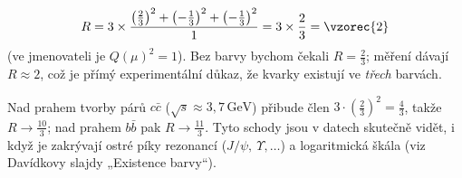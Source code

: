 \[
  R=3\times\frac{\left(\frac23\right)^2+\left(-\frac13\right)^2+
  \left(-\frac13\right)^2}{1}=3\times\frac23=\vzorec{2}
\]
(ve jmenovateli je \(Q(\mu)^2=1\)). Bez barvy bychom čekali
\(R=\tfrac23\); měření dávají \(R\approx2\), což je přímý experimentální
důkaz, že kvarky existují ve \emph{třech} barvách.

\begin{vysvetleni}
Nad prahem tvorby párů \(c\bar c\) (\(\sqrt s\approx3{,}7\,\mathrm{GeV}\))
přibude člen \(3\cdot(\tfrac23)^2=\tfrac43\), takže \(R\to\tfrac{10}3\); nad
prahem \(b\bar b\) pak \(R\to\tfrac{11}3\). Tyto schody jsou v datech
skutečně vidět, i když je zakrývají ostré píky rezonancí
(\(J/\psi,\ \Upsilon,\dots\)) a logaritmická škála (viz Davídkovy slajdy
„Existence barvy“).
\end{vysvetleni}

